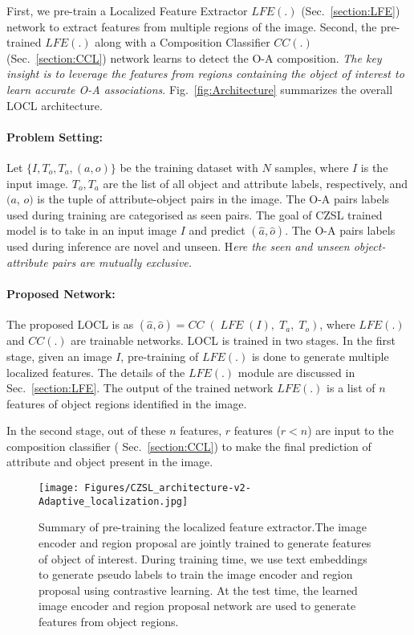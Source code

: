 \documentclass{bmvc2k}
\begin{document}
First, we pre-train a Localized Feature Extractor $LFE(.)$ (Sec.~\ref{section:LFE}) network to extract features from multiple regions of the image.
Second, the pre-trained $LFE(.)$ along with a Composition Classifier $CC(.)$ (Sec.~\ref{section:CCL}) network learns to detect the O-A composition. \textit{The key insight  is to leverage the features from regions containing the object of interest to learn accurate O-A associations}.  Fig.~\ref{fig:Architecture} summarizes the overall LOCL architecture.
\vspace{-0.2cm}
\paragraph{\textbf{Problem Setting:}} Let $\{I, T_o, T_a, (a, o)\}$ be the training dataset with $N$ samples, where $I$ is the input image. $T_o, T_a$ are the list of all object and attribute labels, respectively, and $(a$, $o)$ is the tuple of attribute-object pairs in the image. The O-A pairs labels used during training are categorised as seen pairs. The goal of CZSL trained model is to take in an input image $I$ and predict $(\hat{a}, \hat{o})$. The O-A pairs labels used during inference are novel and unseen. H\textit{ere the seen and unseen object-attribute pairs are mutually exclusive.}
\vspace{-0.2cm}
\paragraph{Proposed Network:} The proposed LOCL is as $(\hat{a}, \hat{o}) = CC\;(\;LFE\;(I),\; T_a, \;T_o)$,
where $LFE(.)$ and $CC(.)$ are trainable networks. LOCL is trained in two stages. In the first stage, given an image $I$, pre-training of $LFE(.)$ is done to generate multiple localized features. The details of the $LFE(.)$ module are discussed in Sec.~\ref{section:LFE}. The output of the trained network $LFE(.)$ is a list of $n$ features of object regions identified in the image.

In the second stage, out of these $n$ features, $r$ features ($r < n$) are input to the composition classifier ( Sec.~\ref{section:CCL}) to make the final prediction of attribute and object present in the image.

\begin{figure*}[t]
\begin{center}
\texttt{[image: Figures/CZSL\_architecture-v2-Adaptive\_localization.jpg]}
\end{center}
 \vspace{-0.4cm}
   \caption{ Summary of pre-training the localized feature extractor.The image encoder and region proposal are jointly trained to generate features of object of interest. During training time, we use text embeddings to generate pseudo labels to train the image encoder and region proposal using contrastive learning. At the test time, the learned image encoder and region proposal network are used to generate features from object regions. 
}
\label{fig:ALM}
\vspace{-0.3cm}
\end{figure*}
\end{document}
